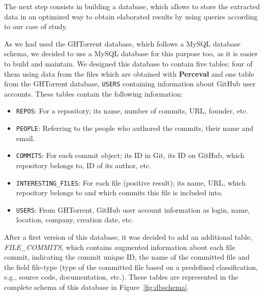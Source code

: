 \documentclass[a4paper, 12pt]{book}
\begin{document}
The next step consists in building a database, which allows to store the extracted data in an optimized way to
obtain elaborated results by using queries according to our case of study.

As we had used the GHTorrent database, which follows a MySQL database schema, we decided to use a MySQL database
for this purpose too, as it is easier to build and maintain.
We designed this database to contain five tables; four of them using data from the files which are obtained with
\textbf{Perceval} and one table from the GHTorrent database, \texttt{USERS} containing information about GitHub user accounts.
These tables contain the following information:
\begin{itemize}
  \item \texttt{REPOS}: For a repository; its name, number of commits, URL, founder, etc.
  \item \texttt{PEOPLE}: Referring to the people who authored the commits, their name and email.
  \item \texttt{COMMITS}: For each commit object; its ID in Git, its ID on GitHub, which repository belongs to, ID of its author, etc.
  \item \texttt{INTERESTING\_FILES}: For each file (positive result); its name, URL, which repository belongs to and which commits this file is included into.
  \item \texttt{USERS}: From GHTorrent, GitHub user account information as login, name, location, company, creation date, etc.
\end{itemize}

After a first version of this database, it was decided to add an additional table, \textit{FILE\_COMMITS},
which contains augmented information about each file commit, indicating the commit unique ID, the name of the committed file and the field
file-type (type of the committed file based on a predefined classification, e.g., source code, documentation, etc.).
These tables are represented in the complete schema of this database in Figure~\ref{fig:dbschema}.
\end{document}
